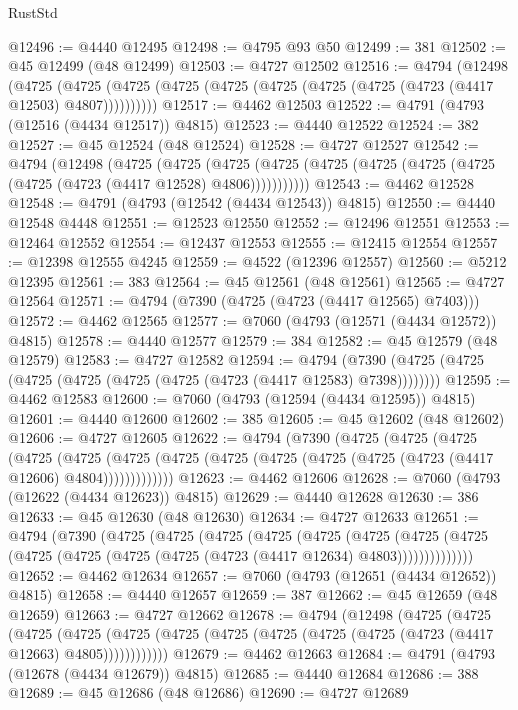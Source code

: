 \begin{lexlean}{RustStd}
\begin{coremodule}
@12496 := @4440 @12495
@12498 := @4795 @93 @50
@12499 := 381
@12502 := @45 @12499 (@48 @12499)
@12503 := @4727 @12502
@12516 := @4794
    (@12498
      (@4725 (@4725 (@4725 (@4725 (@4725 (@4725 (@4725 (@4725 (@4723 (@4417 @12503) @4807))))))))))
@12517 := @4462 @12503
@12522 := @4791 (@4793 (@12516 (@4434 @12517)) @4815)
@12523 := @4440 @12522
@12524 := 382
@12527 := @45 @12524 (@48 @12524)
@12528 := @4727 @12527
@12542 := @4794
    (@12498
      (@4725
        (@4725
          (@4725 (@4725 (@4725 (@4725 (@4725 (@4725 (@4725 (@4723 (@4417 @12528) @4806)))))))))))
@12543 := @4462 @12528
@12548 := @4791 (@4793 (@12542 (@4434 @12543)) @4815)
@12550 := @4440 @12548 @4448
@12551 := @12523 @12550
@12552 := @12496 @12551
@12553 := @12464 @12552
@12554 := @12437 @12553
@12555 := @12415 @12554
@12557 := @12398 @12555 @4245
@12559 := @4522 (@12396 @12557)
@12560 := @5212 @12395
@12561 := 383
@12564 := @45 @12561 (@48 @12561)
@12565 := @4727 @12564
@12571 := @4794 (@7390 (@4725 (@4723 (@4417 @12565) @7403)))
@12572 := @4462 @12565
@12577 := @7060 (@4793 (@12571 (@4434 @12572)) @4815)
@12578 := @4440 @12577
@12579 := 384
@12582 := @45 @12579 (@48 @12579)
@12583 := @4727 @12582
@12594 := @4794 (@7390 (@4725 (@4725 (@4725 (@4725 (@4725 (@4725 (@4723 (@4417 @12583) @7398))))))))
@12595 := @4462 @12583
@12600 := @7060 (@4793 (@12594 (@4434 @12595)) @4815)
@12601 := @4440 @12600
@12602 := 385
@12605 := @45 @12602 (@48 @12602)
@12606 := @4727 @12605
@12622 := @4794
    (@7390
      (@4725
        (@4725
          (@4725
            (@4725
              (@4725
                (@4725 (@4725 (@4725 (@4725 (@4725 (@4725 (@4723 (@4417 @12606) @4804)))))))))))))
@12623 := @4462 @12606
@12628 := @7060 (@4793 (@12622 (@4434 @12623)) @4815)
@12629 := @4440 @12628
@12630 := 386
@12633 := @45 @12630 (@48 @12630)
@12634 := @4727 @12633
@12651 := @4794
    (@7390
      (@4725
        (@4725
          (@4725
            (@4725
              (@4725
                (@4725
                  (@4725
                    (@4725 (@4725 (@4725 (@4725 (@4725 (@4723 (@4417 @12634) @4803))))))))))))))
@12652 := @4462 @12634
@12657 := @7060 (@4793 (@12651 (@4434 @12652)) @4815)
@12658 := @4440 @12657
@12659 := 387
@12662 := @45 @12659 (@48 @12659)
@12663 := @4727 @12662
@12678 := @4794
    (@12498
      (@4725
        (@4725
          (@4725
            (@4725 (@4725 (@4725 (@4725 (@4725 (@4725 (@4725 (@4723 (@4417 @12663) @4805))))))))))))
@12679 := @4462 @12663
@12684 := @4791 (@4793 (@12678 (@4434 @12679)) @4815)
@12685 := @4440 @12684
@12686 := 388
@12689 := @45 @12686 (@48 @12686)
@12690 := @4727 @12689

\end{coremodule}
\end{lexlean}
